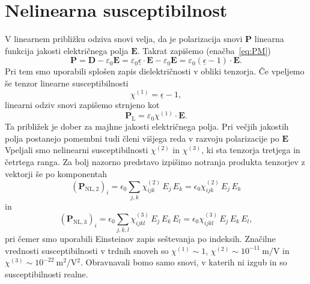 \section{Nelinearna susceptibilnost}
\label{Chap:Chi}
V linearnem približku odziva snovi velja, da je polarizacija snovi 
$\mathbf{P}$ linearna funkcija jakosti električnega polja 
$\mathbf{E}$. Takrat zapišemo (enačba~\ref{eq:PM})
\begin{equation}
\mathbf{P} = \mathbf{D} - \varepsilon_0 \mathbf{E} = 
\varepsilon_0 \underline{\epsilon} \cdot\mathbf{E} - \varepsilon_0 \mathbf{E} = 
\varepsilon_0 (\underline{\epsilon} - 1)\cdot\mathbf{E}. 
\end{equation}
Pri tem smo uporabili splošen zapis dielektričnosti v obliki tenzorja. Če vpeljemo še tenzor linearne susceptibilnosti
\begin{equation}
\chi^{(1)} = \underline{\epsilon} - 1,
\end{equation}
linearni odziv snovi zapišemo strnjeno kot
\begin{equation}
\mathbf{P}_{\mathrm{L}} =  \varepsilon_0 \chi^{(1)} \cdot \mathbf{E}.
\end{equation}
Ta približek je dober za majhne jakosti električnega polja. Pri večjih jakostih polja
postanejo pomembni tudi členi višjega reda v razvoju polarizacije
po $\mathbf{E}$
Vpeljali smo nelinearni susceptibilnosti 
$\chi^{(2)}$ in $\chi^{(3)}$, ki sta tenzorja tretjega in četrtega ranga. 
Za bolj nazorno predstavo izpišimo notranja produkta tenzorjev z vektorji še 
po komponentah
\begin{equation}
\left(\mathbf{P}_{\mathrm{NL,2}}\right)_i= 
\epsilon_{0}\sum_{j,k}\chi^{(2)}_{ijk} \,E_j \,E_k =
\epsilon_{0}\chi^{(2)}_{ijk} \,E_j \,E_k 
\label{eq:nlin2}
\end{equation}
in 
\begin{equation}
\left(\mathbf{P}_{\mathrm{NL,3}}\right)_i= 
\epsilon_{0}\sum_{j,k,l}\chi^{(3)}_{ijkl} \,E_j \,E_k\, E_l=
\epsilon_{0}\chi^{(3)}_{ijkl} \,E_j \,E_k\, E_l,
\label{eq:nlin3}
\end{equation}
pri čemer smo uporabili Einsteinov zapis seštevanja po indeksih. Značilne vrednosti
susceptibilnosti v trdnih snoveh so $\chi^{(1)} \sim 1$, 
$\chi^{(2)} \sim 10^{-11}~\si{\metre/\volt}$ 
in $\chi^{(3)} \sim 10^{-22}~\si{\metre^2/\volt^2}$. Obravnavali bomo samo snovi, v katerih
ni izgub in so susceptibilnosti realne.

